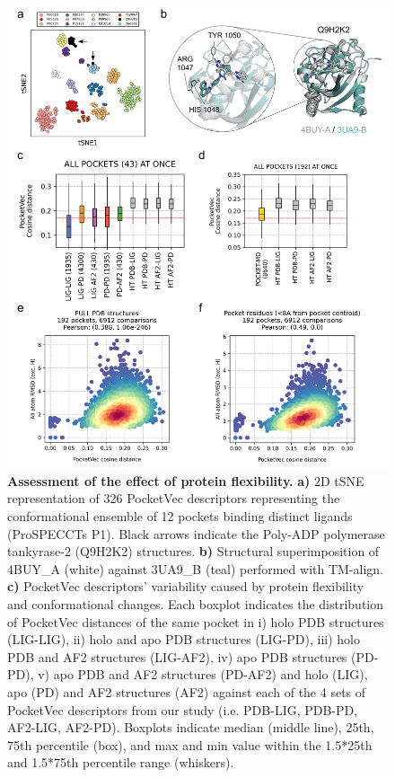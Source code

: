 \begin{figure}[H]
  \centering
  \includegraphics[width=\linewidth]{figures/PocketVec/Main/Fig4.png} 
  \caption{
    \textbf{Assessment of the effect of protein flexibility.} 
    \textbf{a)} 2D tSNE representation of 326 PocketVec descriptors representing the conformational ensemble of 12 pockets binding distinct ligands (ProSPECCTs P1). Black arrows indicate the Poly-ADP polymerase tankyrase-2 (Q9H2K2) structures.
    \textbf{b)} Structural superimposition of 4BUY\_A (white) against 3UA9\_B (teal) performed with TM-align\cite{zhang_tm-align_2005}.
    \textbf{c)} PocketVec descriptors’ variability caused by protein flexibility and conformational changes. Each boxplot indicates the distribution of PocketVec distances of the same pocket in i) holo PDB structures (LIG-LIG), ii) holo and apo PDB structures (LIG-PD), iii) holo PDB and AF2 structures (LIG-AF2), iv) apo PDB structures (PD-PD), v) apo PDB and AF2 structures (PD-AF2) and holo (LIG), apo (PD) and AF2 structures (AF2) against each of the 4 sets of PocketVec descriptors from our study (i.e. PDB-LIG, PDB-PD, AF2-LIG, AF2-PD). Boxplots indicate median (middle line), 25th, 75th percentile (box), and max and min value within the 1.5*25th and 1.5*75th percentile range (whiskers).
}
\end{figure}

